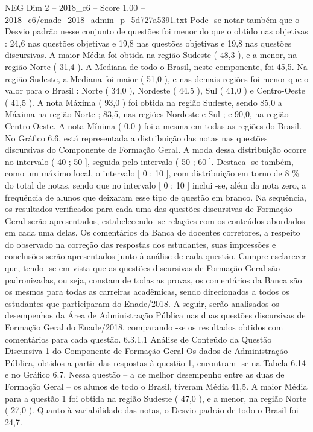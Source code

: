 \begin{textsample}{NEG Dim 2 – 2018\_c6 – Score 1.00 – 2018\_c6/enade\_2018\_admin\_p\_5d727a5391.txt}
Pode -se notar também que o Desvio padrão nesse conjunto de questões foi menor do que o obtido nas objetivas : 24,6 nas questões objetivas e 19,8 nas questões objetivas e 19,8 nas questões discursivas.
A maior Média foi obtida na região Sudeste ( 48,3 ), e a menor, na região Norte ( 31,4 ).
A Mediana de todo o Brasil, neste componente, foi 45,5.
Na região Sudeste, a Mediana foi maior ( 51,0 ), e nas demais regiões foi menor que o valor para o Brasil : Norte ( 34,0 ), Nordeste ( 44,5 ), Sul ( 41,0 ) e Centro-Oeste ( 41,5 ).
A nota Máxima ( 93,0 ) foi obtida na região Sudeste, sendo 85,0 a Máxima na região Norte ; 83,5, nas regiões Nordeste e Sul ; e 90,0, na região Centro-Oeste.
A nota Mínima ( 0,0 ) foi a mesma em todas as regiões do Brasil.
No Gráfico 6.6, está representada a distribuição das notas nas questões discursivas do Componente de Formação Geral.
A moda dessa distribuição ocorre no intervalo ( 40 ; 50 ], seguida pelo intervalo ( 50 ; 60 ].
Destaca -se também, como um máximo local, o intervalo [ 0 ; 10 ], com distribuição em torno de 8 \% do total de notas, sendo que no intervalo [ 0 ; 10 ] inclui -se, além da nota zero, a frequência de alunos que deixaram esse tipo de questão em branco.
Na sequência, os resultados verificados para cada uma das questões discursivas de Formação Geral serão apresentados, estabelecendo -se relações com os conteúdos abordados em cada uma delas.
Os comentários da Banca de docentes corretores, a respeito do observado na correção das respostas dos estudantes, suas impressões e conclusões serão apresentados junto à análise de cada questão.
Cumpre esclarecer que, tendo -se em vista que as questões discursivas de Formação Geral são padronizadas, ou seja, constam de todas as provas, os comentários da Banca são os mesmos para todas as carreiras acadêmicas, sendo direcionados a todos os estudantes que participaram do Enade/2018.
A seguir, serão analisados os desempenhos da Área de Administração Pública nas duas questões discursivas de Formação Geral do Enade/2018, comparando -se os resultados obtidos com comentários para cada questão. 6.3.1.1 Análise de Conteúdo da Questão Discursiva 1 do Componente de Formação Geral Os dados de Administração Pública, obtidos a partir das respostas à questão 1, encontram -se na Tabela 6.14 e no Gráfico 6.7.
Nessa questão – a de melhor desempenho entre as duas de Formação Geral – os alunos de todo o Brasil, tiveram Média 41,5.
A maior Média para a questão 1 foi obtida na região Sudeste ( 47,0 ), e a menor, na região Norte ( 27,0 ).
Quanto à variabilidade das notas, o Desvio padrão de todo o Brasil foi 24,7.

\end{textsample}
